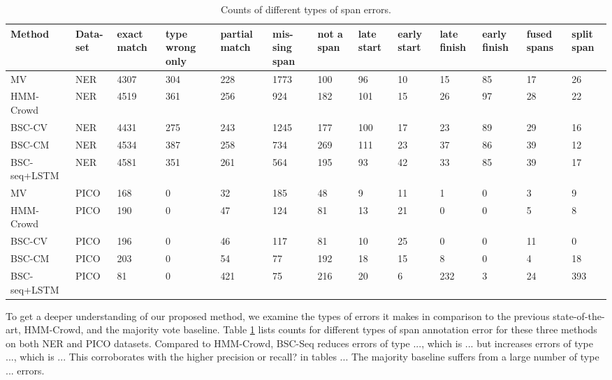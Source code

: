 \begin{table}
\small
\begin{tabularx}{\textwidth}{| l | X | X | X | X | X | X | X | X | X | X | X | X |}
\hline
Method & Data-set & exact match & type wrong only & partial match & mis-sing span & not a span & late start & early start & late finish & early finish & fused spans & split span \\ \hline
MV & NER & 4307 & 304 & 228 & 1773 & 100 & 96 & 10 & 15 & 85 & 17 & 26 \\
HMM-Crowd & NER & 4519 & 361 & 256 & 924 & 182 & 101 & 15 & 26 & 97 & 28 & 22 \\
BSC-CV & NER & 4431 & 275 & 243 & 1245 & 177 & 100 & 17 & 23 & 89 & 29 & 16 \\
BSC-CM & NER & 4534 & 387 & 258 & 734 & 269 & 111 & 23 & 37 & 86 & 39 & 12 \\
BSC-seq+LSTM & NER & 4581 & 351 & 261 & 564 & 195 & 93 & 42 & 33 & 85 & 39 & 17 \\
\hline
MV & PICO    & 168 & 0 & 32 & 185 & 48 & 9 & 11 & 1 & 0 & 3 & 9 \\
HMM-Crowd    & PICO & 190 & 0 & 47 & 124 & 81 & 13 & 21 & 0 & 0 & 5 & 8 \\
BSC-CV       & PICO & 196 & 0 & 46 & 117 & 81 & 10 & 25 & 0 & 0 & 11 & 0 \\
BSC-CM       & PICO & 203 & 0 & 54 & 77 & 192 & 18 & 15 & 8 & 0 & 4 & 18 \\
BSC-seq+LSTM & PICO & 81 & 0 & 421 & 75 & 216 & 20 & 6 & 232 & 3 & 24 & 393 \\
\hline
\end{tabularx}
\caption{Counts of different types of span errors.}
\label{tab:error_analysis}
\end{table}
To get a deeper understanding of our proposed method, we examine the types of errors it makes
in comparison to the previous state-of-the-art, HMM-Crowd, and the majority vote baseline.
Table \ref{tab:error_analysis} lists counts for different types of span annotation error for these
three methods on both
NER and PICO datasets. Compared to HMM-Crowd, BSC-Seq reduces errors of type ..., which is ... but
increases errors of type ..., which is ...
This corroborates with the higher precision or recall? in tables ...
The majority baseline suffers from a large number of type ... errors.

